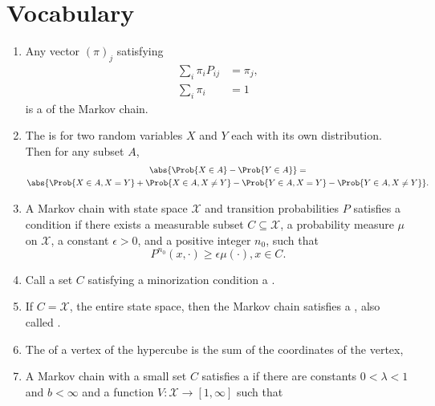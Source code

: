 \documentclass[12pt]{article}
\begin{document}
\section*{Vocabulary}
\begin{enumerate}
    \item
        Any vector \( (\pi)_{j} \) satisfying
        \begin{align}
            \sum\limits_{i} \pi_{i} P_{ij} &= \pi_{j},\\
            \sum\limits_{i} \pi_{i} &= 1
        \end{align}
        is a  of the Markov
        chain.
    \item
        The  is for two random variables \( X \)
        and \( Y \) each with its own distribution.  Then for any subset
        \( A \),
        \begin{multline*}
            \abs{\Prob{X \in A} - \Prob{Y \in A}} = \\
            \abs{\Prob{X \in A, X = Y} + \Prob{X \in A, X \ne Y } -
            \Prob{Y \in A, X = Y} - \Prob{Y \in A, X \ne Y}}.
        \end{multline*}
    \item
        A Markov chain with state space \( \mathcal{X} \) and transition
        probabilities \( P \) satisfies a  condition
        if there exists a measurable subset \( C \subseteq \mathcal{X} \),
        a probability measure \( \mu \) on \( \mathcal{X} \), a constant
        \( \epsilon > 0 \), and a positive integer \( n_0 \), such that
        \[
            P^{n_0} (x, \cdot) \ge \epsilon \mu(\cdot), x \in C.
        \]
    \item
        Call a set \( C \) satisfying a minorization condition a .
    \item
        If \( C = \mathcal{X} \), the entire state space, then the
        Markov chain satisfies a ,
        also called .
    \item
        The  of a vertex of the hypercube is the
        sum of the coordinates of the vertex,
    \item
        A Markov chain with a small set \( C \) satisfies a  if there are constants \( 0 < \lambda < 1 \)
        and \( b < \infty \) and a function \( V :  \mathcal{X} \to [1,
        \infty] \) such that
        \[
\]
\end{enumerate}
\end{document}
